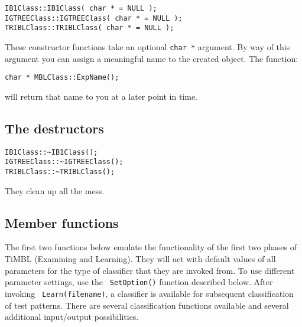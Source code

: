 \documentclass{report}
\begin{document}
\begin{verbatim}
IB1Class::IB1Class( char * = NULL );
IGTREEClass::IGTREEClass( char * = NULL );
TRIBLClass::TRIBLClass( char * = NULL );
\end{verbatim}

These constructor functions take an optional {\tt char *} argument. By
way of this argument you can assign a meaningful name to the created
object. The function:

\begin{verbatim}
char * MBLClass::ExpName();
\end{verbatim}

\noindent
will return that name to you at a later point in time.

\subsection{The destructors}

\begin{verbatim}
IB1Class::~IB1Class();
IGTREEClass::~IGTREEClass();
TRIBLClass::~TRIBLClass();
\end{verbatim}

\noindent
They clean up all the mess.

\subsection{Member functions}

The first two functions below emulate the functionality of the first
two phases of TiMBL (Examining and Learning). They will act with
default values of all parameters for the type of classifier that they
are invoked from. To use different parameter settings, use the {\tt
SetOption()} function described below. After invoking {\tt
Learn(filename)}, a classifier is available for subsequent
classification of test patterns. There are several classification
functions available and several additional input/output possibilities.
\end{document}
